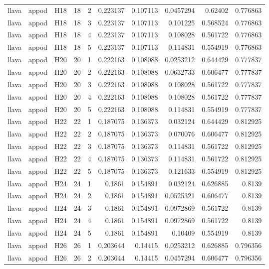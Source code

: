 \begin{longtable}{lllrrrrrrr}
llava & appod & H18 & 18 & 2 & 0.223137 & 0.107113 & 0.0457294 & 0.62402 & 0.776863 \\
llava & appod & H18 & 18 & 3 & 0.223137 & 0.107113 & 0.101225 & 0.568524 & 0.776863 \\
llava & appod & H18 & 18 & 4 & 0.223137 & 0.107113 & 0.108028 & 0.561722 & 0.776863 \\
llava & appod & H18 & 18 & 5 & 0.223137 & 0.107113 & 0.114831 & 0.554919 & 0.776863 \\
llava & appod & H20 & 20 & 1 & 0.222163 & 0.108088 & 0.0253212 & 0.644429 & 0.777837 \\
llava & appod & H20 & 20 & 2 & 0.222163 & 0.108088 & 0.0632733 & 0.606477 & 0.777837 \\
llava & appod & H20 & 20 & 3 & 0.222163 & 0.108088 & 0.108028 & 0.561722 & 0.777837 \\
llava & appod & H20 & 20 & 4 & 0.222163 & 0.108088 & 0.108028 & 0.561722 & 0.777837 \\
llava & appod & H20 & 20 & 5 & 0.222163 & 0.108088 & 0.114831 & 0.554919 & 0.777837 \\
llava & appod & H22 & 22 & 1 & 0.187075 & 0.136373 & 0.032124 & 0.644429 & 0.812925 \\
llava & appod & H22 & 22 & 2 & 0.187075 & 0.136373 & 0.070076 & 0.606477 & 0.812925 \\
llava & appod & H22 & 22 & 3 & 0.187075 & 0.136373 & 0.114831 & 0.561722 & 0.812925 \\
llava & appod & H22 & 22 & 4 & 0.187075 & 0.136373 & 0.114831 & 0.561722 & 0.812925 \\
llava & appod & H22 & 22 & 5 & 0.187075 & 0.136373 & 0.121633 & 0.554919 & 0.812925 \\
llava & appod & H24 & 24 & 1 & 0.1861 & 0.154891 & 0.032124 & 0.626885 & 0.8139 \\
llava & appod & H24 & 24 & 2 & 0.1861 & 0.154891 & 0.0525321 & 0.606477 & 0.8139 \\
llava & appod & H24 & 24 & 3 & 0.1861 & 0.154891 & 0.0972869 & 0.561722 & 0.8139 \\
llava & appod & H24 & 24 & 4 & 0.1861 & 0.154891 & 0.0972869 & 0.561722 & 0.8139 \\
llava & appod & H24 & 24 & 5 & 0.1861 & 0.154891 & 0.10409 & 0.554919 & 0.8139 \\
llava & appod & H26 & 26 & 1 & 0.203644 & 0.14415 & 0.0253212 & 0.626885 & 0.796356 \\
llava & appod & H26 & 26 & 2 & 0.203644 & 0.14415 & 0.0457294 & 0.606477 & 0.796356 \\

\end{longtable}
